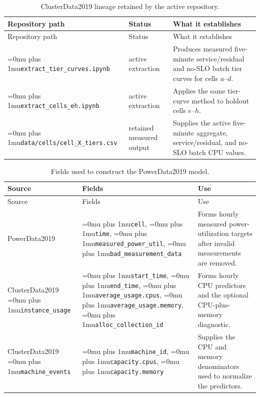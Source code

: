 ﻿\documentclass[12pt]{article}
\newcommand{\codepath}[1]{{\Urlmuskip=0mu plus 1mu\relax\nolinkurl{#1}}}
\begin{document}
\begin{longtable}{@{}L{0.34\textwidth}L{0.19\textwidth}L{0.39\textwidth}@{}}
  \caption{ClusterData2019 lineage retained by the active repository.}
  \label{tab:clusterdata-artifact-lineage}\\
  \toprule
  Repository path & Status & What it establishes \\
  \midrule
  \endfirsthead
  \toprule
  Repository path & Status & What it establishes \\
  \midrule
  \endhead
  \codepath{extract_tier_curves.ipynb}
    & active extraction
    & Produces measured five-minute service/residual and no-SLO batch tier curves
      for cells \(a\)--\(d\). \\
  \codepath{extract_cells_eh.ipynb}
    & active extraction
    & Applies the same tier-curve method to holdout cells \(e\)--\(h\). \\
  \codepath{data/cells/cell_X_tiers.csv}
    & retained measured output
    & Supplies the active five-minute aggregate, service/residual, and no-SLO
      batch CPU values. \\
  \bottomrule
\end{longtable}

\begin{longtable}{@{}L{0.22\textwidth}L{0.30\textwidth}L{0.40\textwidth}@{}}
  \caption{Fields used to construct the PowerData2019 model.}
  \label{tab:powerdata-fields}\\
  \toprule
  Source & Fields & Use \\
  \midrule
  \endfirsthead
  \toprule
  Source & Fields & Use \\
  \midrule
  \endhead
  PowerData2019
    & \codepath{cell}, \codepath{time},
      \codepath{measured_power_util},
      \codepath{bad_measurement_data}
    & Forms hourly measured power-utilization targets after invalid
      measurements are removed. \\
  ClusterData2019 \codepath{instance_usage}
    & \codepath{start_time}, \codepath{end_time},
      \codepath{average_usage.cpus},
      \codepath{average_usage.memory},
      \codepath{alloc_collection_id}
    & Forms hourly CPU predictors and the optional CPU-plus-memory diagnostic. \\
  ClusterData2019 \codepath{machine_events}
    & \codepath{machine_id}, \codepath{capacity.cpus},
      \codepath{capacity.memory}
    & Supplies the CPU and memory denominators used to normalize the predictors. \\
  \bottomrule
\end{longtable}
\end{document}
